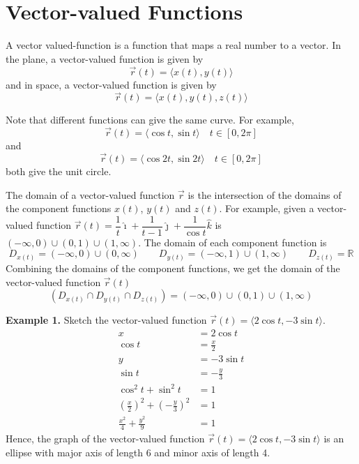 \documentclass{report}
\begin{document}
\chapter{Vector-valued Functions}

A vector valued-function is a function that maps a real number to a vector. In
the plane, a vector-valued function is given by \[\vec{r}(t) = \langle x(t),
    y(t) \rangle\] and in space, a vector-valued function is given by \[\vec{r}(t) =
    \langle x(t), y(t), z(t) \rangle\]

Note that different functions can give the same curve. For example, \[\vec{r}(t) = \langle \cos t, \sin t \rangle \quad t \in [0, 2\pi]\]
and \[\vec{r}(t) = \langle \cos 2t, \sin 2t \rangle \quad t \in [0, 2\pi]\]
both give the unit circle.

The domain of a vector-valued function $\vec{r}$ is the intersection of the
domains of the component functions $x(t)$, $y(t)$ and $z(t)$. For example,
given a vector-valued function $\vec{r}(t) = \dfrac{1}{t}\hat{\imath} +
    \dfrac{1}{t-1}\hat{\jmath} + \dfrac{1}{\cos t}\hat{k}$ is $(-\infty, 0) \cup
    (0, 1) \cup (1, \infty)$. The domain of each component function is \[D_{x(t)} = (-\infty, 0) \cup (0, \infty) \qquad D_{y(t)} = (-\infty, 1) \cup (1, \infty) \qquad D_{z(t)} = \mathbb{R}\]
Combining the domains of the component functions, we get the domain of the
vector-valued function $\vec{r}(t)$ \[(D_{x(t)} \cap D_{y(t)} \cap D_{z(t)}) = (-\infty, 0) \cup (0, 1) \cup (1, \infty)\]

\newpage
\noindent\textbf{Example 1. } Sketch the vector-valued function $\vec{r}(t) = \langle 2\cos t, -3\sin t \rangle$.
\begin{align*}
    x                                                        & = 2\cos t      \\
    \cos t                                                   & = \frac{x}{2}  \\
    y                                                        & = -3\sin t     \\
    \sin t                                                   & = -\frac{y}{3} \\
    \cos^2t + \sin^2t                                        & = 1            \\
    \left(\frac{x}{2}\right)^2 + \left(-\frac{y}{3}\right)^2 & = 1            \\
    \frac{x^2}{4} + \frac{y^2}{9}                            & = 1
\end{align*}
Hence, the graph of the vector-valued function $\vec{r}(t) = \langle 2\cos t, -3\sin t \rangle$ is an ellipse with major axis of length 6 and minor axis of length 4.
\end{document}
